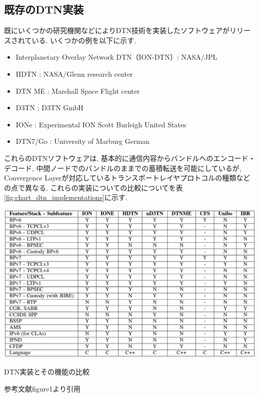 \subsection{既存のDTN実装}
\label{section:既存のDTN実装}
既にいくつかの研究機関などによりDTN技術を実装したソフトウェアがリリースされている.  いくつかの例を以下に示す.  
\begin{itemize}
    \item Interplanetary Overlay Network DTN（ION-DTN）: NASA/JPL
    \item HDTN : NASA/Glenn research center
    \item DTN ME : Marshall Space Flight center
    \item \textmu D3TN : D3TN GmbH
    \item IONe : Experimental ION Scott Burleigh United States 
    \item DTN7/Go : University of Marburg German
\end{itemize}
これらのDTNソフトウェアは,  基本的に通信内容からバンドルへのエンコード・デコード,  
中間ノードでのバンドルのままでの蓄積転送を可能にしているが,  
Convergence Layerが対応しているトランスポートレイヤプロトコルの種類などの点で異なる. 
これらの実装についての比較についてを表\ref{fig:chart_dtn_implementations}に示す. 

\begin{table}[tbh]
    \centering
    \includegraphics[width=0.7\textheight]{img/chart_dtn_implementations.pdf}
    \caption{DTN実装とその機能の比較}
    \label{fig:chart_dtn_implementations}
    \begin{minipage}{\textwidth}
        \centering
        \vspace{3mm}
        参考文献\cite{dtn_implementations}figure1より引用
    \end{minipage}
\end{table}
